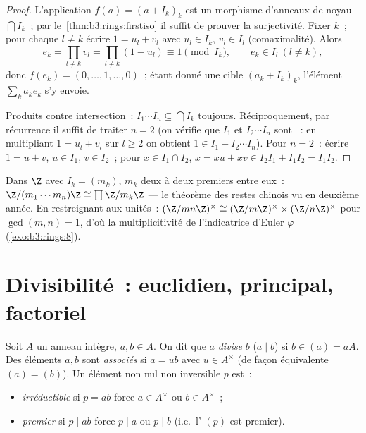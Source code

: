 \begin{proof}
L'application $f(a) = (a + I_k)_k$ est un morphisme d'anneaux de
noyau $\bigcap I_k$~; par le~\cref{thm:b3:rings:firstiso} il
suffit de prouver la surjectivité. Fixer $k$~; pour chaque $l
\neq k$ écrire $1 = u_l + v_l$ avec $u_l \in I_k$, $v_l \in I_l$
(comaximalité). Alors
\[
e_k = \prod_{l \neq k} v_l = \prod_{l\neq k}(1 - u_l)
\equiv 1 \pmod{I_k},
\qquad e_k \in I_l \ (l \neq k),
\]
donc $f(e_k) = (0, \dots, 1, \dots, 0)$~; étant donné une cible
$(a_k + I_k)_k$, l'élément $\sum_k a_k e_k$ s'y envoie.

Produits contre intersection~: $I_1\cdots I_n \subseteq \bigcap
I_k$ toujours. Réciproquement, par récurrence il suffit de
traiter $n = 2$ (on vérifie que $I_1$ et $I_2\cdots I_n$ sont
~: en multipliant $1 = u_l + v_l$ sur $l \geq 2$ on
obtient $1 \in I_1 + I_2\cdots I_n$). Pour $n = 2$~: écrire $1 =
u + v$, $u \in I_1$, $v \in I_2$~; pour $x \in I_1 \cap I_2$, $x
= xu + xv \in I_2I_1 + I_1I_2 = I_1I_2$.
\end{proof}

\begin{example}\label{ex:b3:rings:crtz}
Dans $\Z$ avec $I_k = (m_k)$, $m_k$ deux à deux premiers entre
eux~: $\Z/(m_1\cdots m_n)\Z \cong \prod \Z/m_k\Z$ --- le
théorème des restes chinois vu en deuxième année. En restreignant
aux unités~: $(\Z/mn\Z)^\times \cong (\Z/m\Z)^\times \times
(\Z/n\Z)^\times$ pour $\gcd(m,n)=1$, d'où la multiplicitivité de
l'indicatrice d'Euler $\varphi$ (\cref{exo:b3:rings:8}).
\end{example}

\section{Divisibilité~: euclidien, principal, factoriel}

\begin{definition}\label{def:b3:rings:divisibility}
Soit $A$ un anneau intègre, $a, b \in A$. On dit que $a$
\emph{divise} $b$ ($a \mid b$) si $b \in (a) = aA$. Des éléments
$a, b$ sont \emph{associés} si $a = ub$
avec $u \in A^\times$ (de façon équivalente $(a) = (b)$). Un
élément non nul non inversible $p$ est~:
\begin{itemize}
  \item \emph{irréductible} si $p =
        ab$ force $a \in A^\times$ ou $b \in A^\times$~;
  \item \emph{premier} si $p \mid ab$
        force $p \mid a$ ou $p \mid b$ (i.e.\ l' $(p)$ est
        premier).
\end{itemize}
\end{definition}

